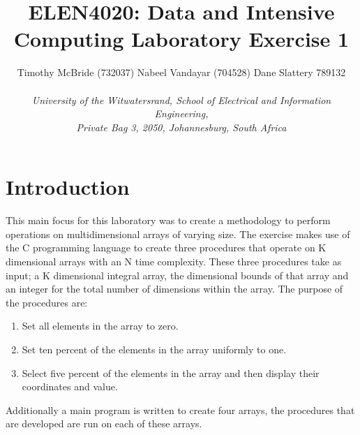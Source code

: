 \documentclass{TechReport}
\begin{document}
%
\title{ELEN4020: Data and Intensive Computing Laboratory Exercise 1}
%
\author{Timothy McBride (732037) \hspace{1.5em} Nabeel Vandayar (704528) \hspace{1.5em} Dane Slattery 789132\\  
\\	
\emph{University of the Witwatersrand, School of Electrical and Information Engineering,\\ Private Bag 3, 2050,
	Johannesburg, South Africa
                                                              }}


%
\maketitle
%
\section{Introduction}
\label{sec:Introduction}
This main focus for this laboratory was to create a methodology to perform operations on multidimensional arrays of varying size. The exercise makes use of the C programming language to create three procedures that operate on K dimensional arrays with an N time complexity. These three procedures take as input; a K dimensional integral array, the dimensional bounds of that array and an integer for the total number of dimensions within the array. The purpose of the procedures are:
\begin{enumerate}
\item Set all elements in the array to zero.
\item Set ten percent of the elements in the array uniformly to one.
\item Select five percent of the elements in the array and then display their coordinates and value.
\end{enumerate} 
Additionally a main program is written to create four arrays, the procedures that are developed are run on each of these arrays.
 
\end{document}
